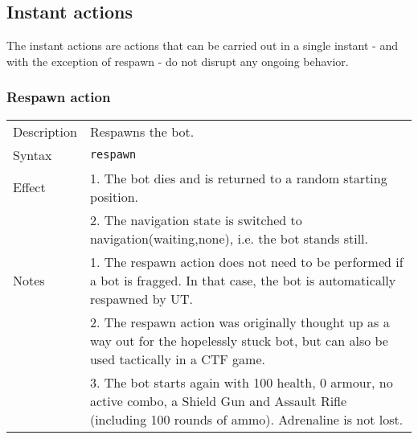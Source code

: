 \documentclass[11pt,a4paper]{article}
\begin{document}
%
\subsection{Instant actions}
%
The instant actions are actions that can be carried out in a single instant - and with the exception of respawn - do not disrupt any ongoing behavior.

%
\subsubsection*{Respawn action}
%
\begin{small}
\begin{tabular}{p{2cm}p{9cm}}
Description & Respawns the bot.\\ 
Syntax & \verb|respawn|\\
Effect &	1.	The bot dies and is returned to a random starting position.\\ 
&	2.	The navigation state is switched to navigation(waiting,none), i.e. the bot stands still.\\
Notes
&	1.	The respawn action does not need to be performed if a bot is fragged. In that case, the bot is automatically respawned by UT.\\
&	2.	The respawn action was originally thought up as a way out for the hopelessly stuck bot, but can also be used tactically in a CTF game.\\
&	3.	The bot starts again with 100 health, 0 armour, no active combo, a Shield Gun and Assault Rifle (including 100 rounds of ammo). Adrenaline is not lost.
\end{tabular}
\end{small}

%
\end{document}
